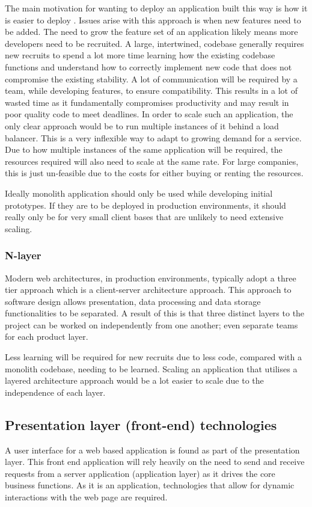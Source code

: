 The main motivation for wanting to deploy an application built this way is how it is easier to deploy \cite{namiot2014micro}.
Issues arise with this approach is when new features need to be added. The need to grow the feature set of an application likely means
more developers need to be recruited. A large, intertwined, codebase generally requires new recruits to spend a lot more time learning
how the existing codebase functions and understand how to correctly implement new code that does not compromise the existing stability.
A lot of communication will be required by a team, while developing features, to ensure compatibility.
This results in a lot of wasted time as it fundamentally compromises productivity and may result in poor quality code to meet deadlines.
In order to scale such an application, the only clear approach would be to run multiple instances of it behind a load balancer.
This is a very inflexible way to adapt to growing demand for a service.
Due to how multiple instances of the same application will be required, the resources required will also need to scale at the same rate.
For large companies, this is just un-feasible due to the costs for either buying or renting the resources. 

Ideally monolith application should only be used while developing initial prototypes. If they are to be deployed in production environments,
it should really only be for very small client bases that are unlikely to need extensive scaling.

\subsubsection{N-layer}

Modern web architectures, in production environments, typically adopt a three tier approach which is a client-server architecture approach.
This approach to software design allows presentation, data processing and data storage functionalities to be separated.
A result of this is that three distinct layers to the project can be worked on independently from one another; even separate teams for
each product layer. 

Less learning will be required for new recruits due to less code, compared with a monolith codebase, needing to be learned.
Scaling an application that utilises a layered architecture approach would be a lot easier to scale due to the independence of each layer.

\subsection{Presentation layer (front-end) technologies}
A user interface for a web based application is found as part of the presentation layer.
This front end application will rely heavily on the need to send and receive requests from a server application (application layer) as 
it drives the core business functions.
As it is an application, technologies that allow for dynamic interactions with the web page are required.

